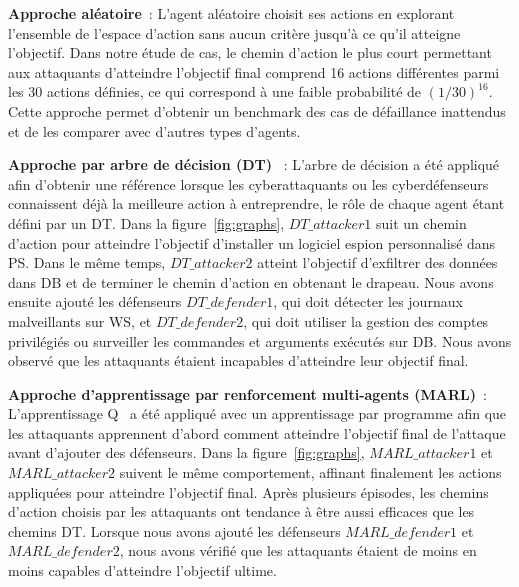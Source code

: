 


\noindent
\textbf{Approche aléatoire}~: \quad L'agent aléatoire choisit ses actions en explorant l'ensemble de l'espace d'action sans aucun critère jusqu'à ce qu'il atteigne l'objectif. Dans notre étude de cas, le chemin d'action le plus court permettant aux attaquants d'atteindre l'objectif final comprend 16 actions différentes parmi les 30 actions définies, ce qui correspond à une faible probabilité de $(1/30)^{16}$.
Cette approche permet d'obtenir un benchmark des cas de défaillance inattendus et de les comparer avec d'autres types d'agents.

\noindent
\textbf{Approche par arbre de décision (DT) }~: \quad L'arbre de décision a été appliqué afin d'obtenir une référence lorsque les cyberattaquants ou les cyberdéfenseurs connaissent déjà la meilleure action à entreprendre, le rôle de chaque agent étant défini par un DT.
Dans la figure~\ref{fig:graphs}, $DT\_attacker1$ suit un chemin d'action pour atteindre l'objectif d'installer un logiciel espion personnalisé dans PS. Dans le même temps, $DT\_attacker2$ atteint l'objectif d'exfiltrer des données dans DB et de terminer le chemin d'action en obtenant le drapeau. Nous avons ensuite ajouté les défenseurs $DT\_defender1$, qui doit détecter les journaux malveillants sur WS, et $DT\_defender2$, qui doit utiliser la gestion des comptes privilégiés ou surveiller les commandes et arguments exécutés sur DB. Nous avons observé que les attaquants étaient incapables d'atteindre leur objectif final.

\noindent
\textbf{Approche d'apprentissage par renforcement multi-agents (MARL)}~: \quad L'apprentissage Q~\cite{CWatkins1992} a été appliqué avec un apprentissage par programme afin que les attaquants apprennent d'abord comment atteindre l'objectif final de l'attaque avant d'ajouter des défenseurs.
Dans la figure~\ref{fig:graphs}, $MARL\_attacker1$ et $MARL\_attacker2$ suivent le même comportement, affinant finalement les actions appliquées pour atteindre l'objectif final. Après plusieurs épisodes, les chemins d'action choisis par les attaquants ont tendance à être aussi efficaces que les chemins DT. Lorsque nous avons ajouté les défenseurs $MARL\_defender1$ et $MARL\_defender2$, nous avons vérifié que les attaquants étaient de moins en moins capables d'atteindre l'objectif ultime.

